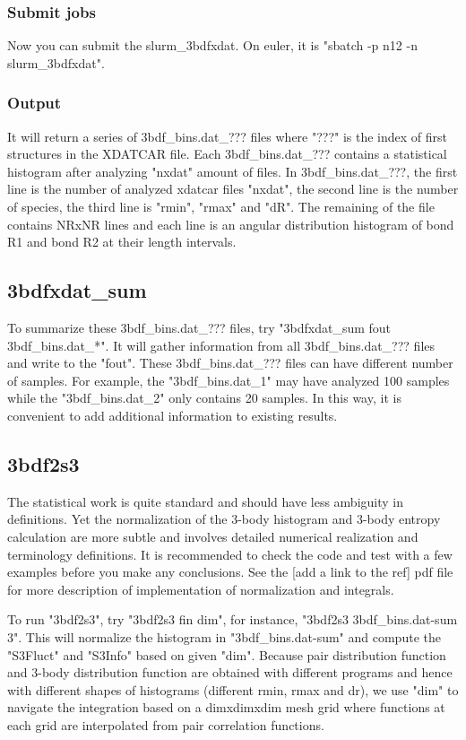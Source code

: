 \documentclass[11pt]{article}
\begin{document}
\subsubsection{Submit jobs}
\label{sec:org16313d7}
Now you can submit the slurm\_3bdfxdat. On euler, it is "sbatch -p n12
-n slurm\_3bdfxdat".

\subsubsection{Output}
\label{sec:org1761365}
It will return a series of 3bdf\_bins.dat\_??? files where "???" is the
index of first structures in the XDATCAR file. Each 3bdf\_bins.dat\_???
contains a statistical histogram after analyzing "nxdat" amount of files.
In 3bdf\_bins.dat\_???, the first line is the number of analyzed xdatcar
files "nxdat", the second line is
the number of species, the third line is "rmin", "rmax" and "dR". The
remaining of the file contains NRxNR lines and each line is an angular
distribution histogram of bond R1 and bond R2 at their length intervals.

\subsection{3bdfxdat\_sum}
\label{sec:org058fe24}
To summarize these 3bdf\_bins.dat\_??? files, try
"3bdfxdat\_sum fout 3bdf\_bins.dat\_*". It will gather information from
all 3bdf\_bins.dat\_??? files and write to the "fout". These
3bdf\_bins.dat\_??? files can have different number of samples. For
example, the "3bdf\_bins.dat\_1" may have analyzed 100 samples while the
"3bdf\_bins.dat\_2" only contains 20 samples. In this way, it is
convenient to add additional information to existing results.

\subsection{3bdf2s3}
\label{sec:org58126b8}
The statistical work is quite standard and should have less ambiguity
in definitions. Yet the normalization  of the 3-body histogram and
3-body entropy calculation are more subtle and involves detailed
numerical realization and terminology definitions. It is recommended
to check the code and test with a few examples before you make any
conclusions. See the [add a link to the ref] pdf file for more description of
implementation of normalization and integrals.

To run "3bdf2s3", try "3bdf2s3 fin dim", for instance, "3bdf2s3
3bdf\_bins.dat-sum 3". This will normalize the histogram in
"3bdf\_bins.dat-sum" and compute the "S3Fluct" and "S3Info" based on
given "dim". Because pair distribution function and 3-body
distribution function are obtained with different programs and hence
with different shapes of histograms (different rmin, rmax and dr), we
use "dim" to navigate the integration based on a dimxdimxdim mesh grid
where functions at each grid are interpolated from pair correlation functions.
\end{document}
